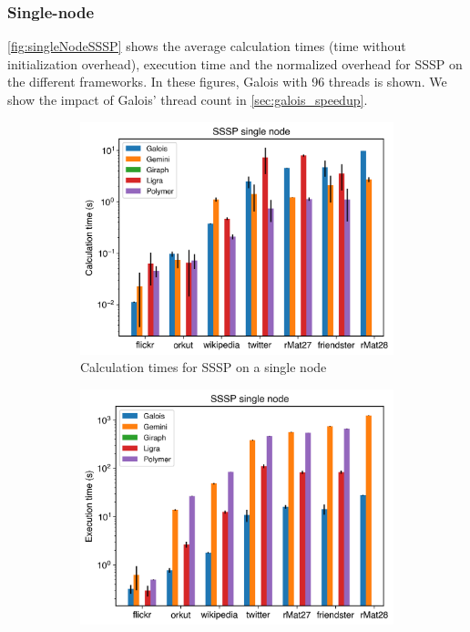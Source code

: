 \subsubsection{Single-node}

\autoref{fig:singleNodeSSSP} shows the average calculation times (time without initialization overhead), execution time and the normalized overhead for SSSP on the different frameworks. In these figures, Galois with 96 threads is shown. We show the impact of Galois' thread count in \autoref{sec:galois_speedup}.
\begin{figure}[t!]
	\begin{subfigure}{0.3\textwidth}
		\includegraphics[width=\linewidth]{../../plots/singleNodeSSSP_calcTime.png}
		\caption{Calculation times for SSSP on a single node}
		\label{fig:singleNodeSSSP_calc}
	\end{subfigure}
	\hfil
	\begin{subfigure}{0.3\textwidth}
		\includegraphics[width=\linewidth]{../../plots/singleNodeSSSP_execTime.png}

\end{subfigure}
\end{figure}
